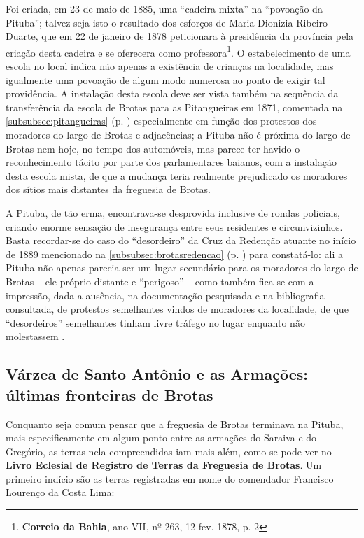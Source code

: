 Foi criada, em 23 de maio de 1885, uma ``cadeira mixta'' na ``povoação da Pituba''\cite[p.~126]{bahia_relatassleg_1886}; talvez seja isto o resultado dos esforços de Maria Dionizia Ribeiro Duarte, que em 22 de janeiro de 1878 peticionara à presidência da província pela criação desta cadeira e se oferecera como professora\footnote{\textbf{Correio da Bahia}, ano VII, nº 263, 12 fev. 1878, p. 2}. O estabelecimento de uma escola no local indica não apenas a existência de crianças na localidade, mas igualmente uma povoação de algum modo numerosa ao ponto de exigir tal providência. A instalação desta escola deve ser vista também na sequência da transferência da escola de Brotas para as Pitangueiras em 1871, comentada na \autoref{subsubsec:pitangueiras} (p. \pageref{subsubsec:pitangueiras}) especialmente em função dos protestos dos moradores do largo de Brotas e adjacências; a Pituba não é próxima do largo de Brotas nem hoje, no tempo dos automóveis, mas parece ter havido o reconhecimento tácito por parte dos parlamentares baianos, com a instalação desta escola mista, de que a mudança teria realmente prejudicado os moradores dos sítios mais distantes da freguesia de Brotas.

A Pituba, de tão erma, encontrava-se desprovida inclusive de rondas policiais, criando enorme sensação de insegurança entre seus residentes e circunvizinhos. Basta recordar-se do caso do ``desordeiro'' da Cruz da Redenção atuante no início de 1889 mencionado na \autoref{subsubsec:brotasredencao} (p. \pageref{subsubsec:brotasredencao}) para constatá-lo: ali a Pituba não apenas parecia ser um lugar secundário para os moradores do largo de Brotas -- ele próprio distante e ``perigoso'' -- como também fica-se com a impressão, dada a ausência, na documentação pesquisada e na bibliografia consultada, de protestos semelhantes vindos de moradores da localidade, de que ``desordeiros'' semelhantes tinham livre tráfego no lugar enquanto não molestassem .

\subsection{Várzea de Santo Antônio e as Armações: últimas fronteiras de Brotas}

Conquanto seja comum pensar que a freguesia de Brotas terminava na Pituba, mais especificamente em algum ponto entre as armações do Saraiva e do Gregório, as terras nela compreendidas iam mais além, como se pode ver no \textbf{Livro Eclesial de Registro de Terras da Freguesia de Brotas}. Um primeiro indício são as terras registradas em nome do comendador Francisco Lourenço da Costa Lima:

